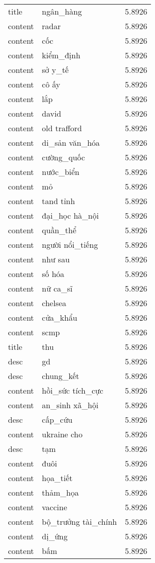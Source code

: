 \documentclass{article}
\begin{document}
\begin{tabular}{lll}
title & ngân\_hàng & 5.8926\\
content & radar & 5.8926\\
content & cốc & 5.8926\\
content & kiểm\_định & 5.8926\\
content & sở y\_tế & 5.8926\\
content & cô ấy & 5.8926\\
content & lắp & 5.8926\\
content & david & 5.8926\\
content & old trafford & 5.8926\\
content & di\_sản văn\_hóa & 5.8926\\
content & cường\_quốc & 5.8926\\
content & nước\_biển & 5.8926\\
content & mỏ & 5.8926\\
content & tand tỉnh & 5.8926\\
content & đại\_học hà\_nội & 5.8926\\
content & quần\_thể & 5.8926\\
content & người nổi\_tiếng & 5.8926\\
content & như sau & 5.8926\\
content & số hóa & 5.8926\\
content & nữ ca\_sĩ & 5.8926\\
content & chelsea & 5.8926\\
content & cửa\_khẩu & 5.8926\\
content & scmp & 5.8926\\
title & thu & 5.8926\\
desc & gd & 5.8926\\
desc & chung\_kết & 5.8926\\
content & hồi\_sức tích\_cực & 5.8926\\
content & an\_sinh xã\_hội & 5.8926\\
desc & cấp\_cứu & 5.8926\\
content & ukraine cho & 5.8926\\
desc & tạm & 5.8926\\
content & đuôi & 5.8926\\
content & họa\_tiết & 5.8926\\
content & thảm\_họa & 5.8926\\
content & vaccine & 5.8926\\
content & bộ\_trưởng tài\_chính & 5.8926\\
content & dị\_ứng & 5.8926\\
content & bấm & 5.8926\\

\end{tabular}
\end{document}

